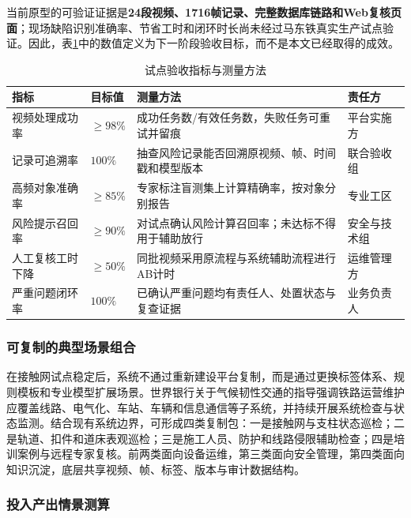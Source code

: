 \documentclass[UTF8,a4paper,zihao=-4]{ctexart}
\newcommand{\keynum}[1]{\textcolor{railred}{\bfseries #1}}
\begin{document}
当前原型的可验证证据是\keynum{24段视频、1716帧记录、完整数据库链路和Web复核页面}；现场缺陷识别准确率、节省工时和闭环时长尚未经过马东铁真实生产试点验证。因此，表\ref{tab:pilot-kpi}中的数值定义为下一阶段验收目标，而不是本文已经取得的成效。

\begin{table}[H]
\centering
\caption{试点验收指标与测量方法}
\label{tab:pilot-kpi}
\small
\begin{tabularx}{\textwidth}{p{}p{}X p{}}
\toprule
指标 & 目标值 & 测量方法 & 责任方 \\
\midrule
视频处理成功率 & $\geq98\%$ & 成功任务数/有效任务数，失败任务可重试并留痕 & 平台实施方 \\
记录可追溯率 & $100\%$ & 抽查风险记录能否回溯原视频、帧、时间戳和模型版本 & 联合验收组 \\
高频对象准确率 & $\geq85\%$ & 专家标注盲测集上计算精确率，按对象分别报告 & 专业工区 \\
风险提示召回率 & $\geq90\%$ & 对试点确认风险计算召回率；未达标不得用于辅助放行 & 安全与技术组 \\
人工复核工时下降 & $\geq50\%$ & 同批视频采用原流程与系统辅助流程进行AB计时 & 运维管理方 \\
严重问题闭环率 & $100\%$ & 已确认严重问题均有责任人、处置状态与复查证据 & 业务负责人 \\
\bottomrule
\end{tabularx}
\end{table}

\subsubsection{可复制的典型场景组合}

在接触网试点稳定后，系统不通过重新建设平台复制，而是通过更换标签体系、规则模板和专业模型扩展场景。世界银行关于气候韧性交通的指导强调铁路运营维护应覆盖线路、电气化、车站、车辆和信息通信等子系统，并持续开展系统检查与状态监测\cite{worldbank-resilient-transport}。结合现有系统边界，可形成四类复制包：一是接触网与支柱状态巡检；二是轨道、扣件和道床表观巡检；三是施工人员、防护和线路侵限辅助检查；四是培训案例与远程专家复核。前两类面向设备运维，第三类面向安全管理，第四类面向知识沉淀，底层共享视频、帧、标签、版本与审计数据结构。

\subsubsection{投入产出情景测算}
\end{document}
